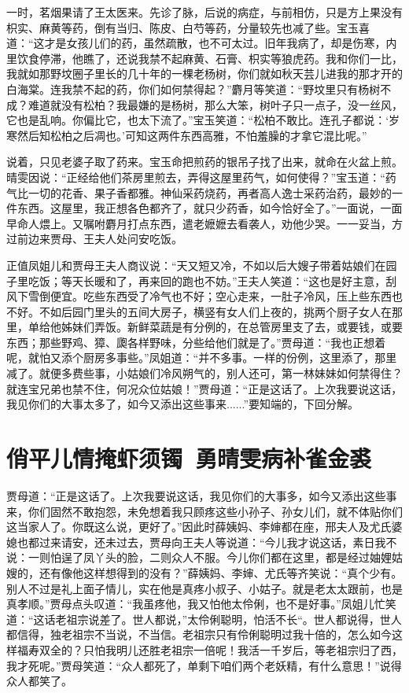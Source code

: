 \documentclass[12pt,oneside]{book}
\begin{document}
一时，茗烟果请了王太医来。先诊了脉，后说的病症，与前相仿，只是方上果没有枳实、麻黄等药，倒有当归、陈皮、白芍等药，分量较先也减了些。宝玉喜道：“这才是女孩儿们的药，虽然疏散，也不可太过。旧年我病了，却是伤寒，内里饮食停滞，他瞧了，还说我禁不起麻黄、石膏、枳实等狼虎药。我和你们一比，我就如那野坟圈子里长的几十年的一棵老杨树，你们就如秋天芸儿进我的那才开的白海棠。连我禁不起的药，你们如何禁得起？”麝月等笑道：“野坟里只有杨树不成？难道就没有松柏？我最嫌的是杨树，那么大笨，树叶子只一点子，没一丝风，它也是乱响。你偏比它，也太下流了。”宝玉笑道：“松柏不敢比。连孔子都说：‘岁寒然后知松柏之后凋也。’可知这两件东西高雅，不怕羞臊的才拿它混比呢。”

说着，只见老婆子取了药来。宝玉命把煎药的银吊子找了出来，就命在火盆上煎。晴雯因说：“正经给他们茶房里煎去，弄得这屋里药气，如何使得？”宝玉道：“药气比一切的花香、果子香都雅。神仙采药烧药，再者高人逸士采药治药，最妙的一件东西。这屋里，我正想各色都齐了，就只少药香，如今恰好全了。”一面说，一面早命人煨上。又嘱咐麝月打点东西，遣老嬷嬷去看袭人，劝他少哭。一一妥当，方过前边来贾母、王夫人处问安吃饭。

正值凤姐儿和贾母王夫人商议说：“天又短又冷，不如以后大嫂子带着姑娘们在园子里吃饭；等天长暖和了，再来回的跑也不妨。”王夫人笑道：“这也是好主意，刮风下雪倒便宜。吃些东西受了冷气也不好；空心走来，一肚子冷风，压上些东西也不好。不如后园门里头的五间大房子，横竖有女人们上夜的，挑两个厨子女人在那里，单给他姊妹们弄饭。新鲜菜蔬是有分例的，在总管房里支了去，或要钱，或要东西；那些野鸡、獐、瓟各样野味，分些给他们就是了。”贾母道：“我也正想着呢，就怕又添个厨房多事些。”凤姐道：“并不多事。一样的份例，这里添了，那里减了。就便多费些事，小姑娘们冷风朔气的，别人还可，第一林妹妹如何禁得住？就连宝兄弟也禁不住，何况众位姑娘！”贾母道：“正是这话了。上次我要说这话，我见你们的大事太多了，如今又添出这些事来......”要知端的，下回分解。
 


 
\chapter{俏平儿情掩虾须镯~勇晴雯病补雀金裘}
贾母道：“正是这话了。上次我要说这话，我见你们的大事多，如今又添出这些事来，你们固然不敢抱怨，未免想着我只顾疼这些小孙子、孙女儿们，就不体贴你们这当家人了。你既这么说，更好了。”因此时薛姨妈、李婶都在座，邢夫人及尤氏婆媳也都过来请安，还未过去，贾母向王夫人等说道：“今儿我才说这话，素日我不说：一则怕逞了凤丫头的脸，二则众人不服。今儿你们都在这里，都是经过妯娌姑嫂的，还有像他这样想得到的没有？”薛姨妈、李婶、尤氏等齐笑说：“真个少有。别人不过是礼上面子情儿，实在他是真疼小叔子、小姑子。就是老太太跟前，也是真孝顺。”贾母点头叹道：“我虽疼他，我又怕他太伶俐，也不是好事。”凤姐儿忙笑道：“这话老祖宗说差了。世人都说，”太伶俐聪明，怕活不长“。世人都说得，世人都信得，独老祖宗不当说，不当信。老祖宗只有伶俐聪明过我十倍的，怎么如今这样福寿双全的？只怕我明儿还胜老祖宗一倍呢！我活一千岁后，等老祖宗归了西，我才死呢。”贾母笑道：“众人都死了，单剩下咱们两个老妖精，有什么意思！”说得众人都笑了。
\end{document}
